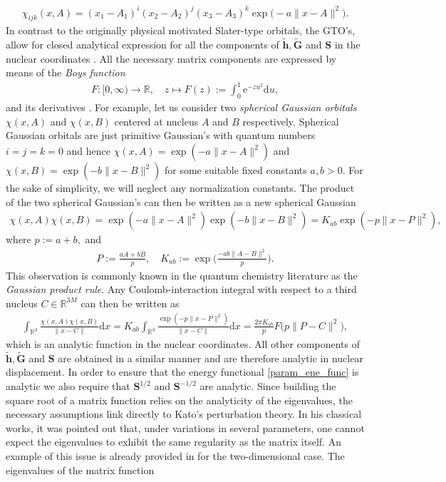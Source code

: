 \documentclass[reqno]{amsart}
\begin{document}
\begin{align}\label{GTO}
    \chi_{ijk}(x,A)=(x_1-A_1)^i(x_2-A_2)^j(x_3-A_3)^k\exp\big(-a\|x-A\|^2\big).
\end{align}
In contrast to the originally physical motivated Slater-type orbitals, the GTO's, allow for closed analytical expression for all the components of $\tilde{\mathbf{h}}, \tilde{\mathbf{G}}$ and $\mathbf{S}$ in the nuclear coordinates \cite{Boys}. All the necessary matrix components are expressed by means of the \textit{Boys function}
\begin{align}
   F:[0,\infty)\longrightarrow \mathbb{R}, \quad z\mapsto F(z):= \int^1_0 \mathrm{e}^{-zu^2}\mathrm{d}u,
\end{align} and its derivatives \cite{MCMURCHIE1978218,Obarasaika,Beylkin_2021}. For example, let us consider two \textit{spherical Gaussian orbitals} $\chi(x,A)$ and $\chi(x,B)$  centered at nucleus $A$ and $B$ respectively. Spherical Gaussian orbitals are just primitive Gaussian's with quantum numbers $i=j=k=0$ and hence $\chi(x,A)=\exp(-a\|x-A\|^2)$ and $\chi(x,B)=\exp(-b\|x-B\|^2)$ for some suitable fixed constants $a,b>0$. For the sake of simplicity, we will neglect any normalization constants. The product of the two spherical Gaussian's can then be written as a new spherical Gaussian 
\begin{align}
    \chi(x,A)\chi(x,B)= \exp(-a\|x-A\|^2)\exp(-b\|x-B\|^2)=K_{ab}\exp(-p\|x-P\|^2),
\end{align}
where $p:=a+b,$ and
\begin{align}
    P:=\frac{aA+bB}{p},\quad K_{ab}:=\exp\Big(\frac{-ab\|A-B\|^2}{p}\Big).
\end{align}
This observation is commonly known in the quantum chemistry literature as the \textit{Gaussian product rule}. Any Coulomb-interaction integral with respect to a third nucleus $C\in \mathbb{R}^{3M}$ can then be written as
\begin{align*}
    \int_{\mathbb{R}^3}\frac{\chi(x,A)\chi(x,B)}{\|x-C\|}\mathrm{d}x=K_{ab}\int_{\mathbb{R}^3}\frac{\exp(-p\|x-P\|^2)}{\|x-C\|}\mathrm{d}x= \frac{2\pi K_{ab}}{p}F\big(p\|P-C\|^2\big),
\end{align*}
which is an analytic function in the nuclear coordinates. All other components of $\tilde{\mathbf{h}}, \tilde{\mathbf{G}}$ and $\mathbf{S}$ are obtained in a similar manner and are therefore analytic in nuclear displacement. In order to ensure that the energy functional \eqref{param_ene_func} is analytic we also require that $\mathbf{S}^{1/2}$ and $\mathbf{S}^{-1/2}$ are analytic. Since building the square root of a matrix function relies on the analyticity of the eigenvalues, the necessary assumptions link directly to Kato's perturbation theory. In his classical works, it was pointed out that, under variations in several parameters, one cannot expect the eigenvalues to exhibit the same regularity as the matrix itself. An example of this issue is already provided in \cite{Kato:1966:PTL} for the two-dimensional case. The eigenvalues of the matrix function 
\end{document}

